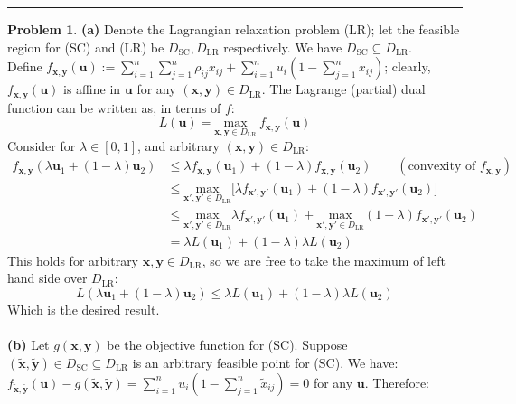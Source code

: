 \documentclass[a4paper, 8pt]{article}
\theoremstyle{definition}
\newtheorem{problem}{Problem}
\theoremstyle{hSol}
\begin{document}
\noindent\rule{16cm}{0.4pt}
\begin{problem} \textbf{(a)} Denote the Lagrangian relaxation problem (LR); let the feasible region for (SC) and (LR) be $D_{\text{SC}}, D_{\text{LR}}$ respectively. We have $D_{\text{SC}}\subseteq D_{\text{LR}}$. \\
Define $f_{\bm{x,y}}(\bm{u}):=\sum_{i=1}^n \sum_{j=1}^n \rho_{ij}x_{ij}+\sum_{i=1}^n u_i\left(1-\sum_{j=1}^n x_{ij}\right)$; clearly, $f_{\bm{x,y}}(\bm{u})$ is affine in $\bm{u}$ for any $(\bm{x}, \bm{y}) \in D_{\text{LR}}$. The Lagrange (partial) dual function can be written as, in terms of $f$:
\begin{equation}
	L(\bm{u}) = \underset{\bm{x,y} \in D_{\text{LR}}}{\text{max}} ~f_{\bm{x,y}}(\bm{u})
\end{equation}
Consider for $\lambda\in [0,1]$, and arbitrary $(\bm{x}, \bm{y}) \in D_{\text{LR}}$:
\begin{equation}
	\begin{split}
		f_{\bm{x}, \bm{y}}(\lambda\bm{u}_1 + (1- \lambda) \bm{u}_2) & \leq  \lambda f_{\bm{x}, \bm{y}}(\bm{u}_1) + (1- \lambda)f_{\bm{x}, \bm{y}}(\bm{u}_2)\qquad(\text{convexity of } f_{\bm{x,y}})\\
		&\leq \underset{\bm{x}', \bm{y}' \in D_{\text{LR}}}{\text{max}} \big[\lambda f_{\bm{x}', \bm{y}'}(\bm{u}_1) + (1- \lambda)f_{\bm{x}', \bm{y}'}(\bm{u}_2)\big] \\
		&\leq \underset{\bm{x}', \bm{y}' \in D_{\text{LR}}}{\text{max}} \lambda f_{\bm{x}', \bm{y}'}(\bm{u}_1) + \underset{\bm{x}', \bm{y}' \in D_{\text{LR}}}{\text{max}}(1- \lambda)f_{\bm{x}', \bm{y}'}(\bm{u}_2)\\
		&= \lambda L(\bm{u}_1) + (1- \lambda)\lambda L(\bm{u}_2)
	\end{split}
\end{equation}
This holds for arbitrary $\bm{x}, \bm{y} \in D_{\text{LR}}$, so we are free to take the maximum of left hand side over $D_{\text{LR}}$:
\begin{equation}
	L(\lambda\bm{u}_1 + (1- \lambda) \bm{u}_2)\leq \lambda L(\bm{u}_1) + (1- \lambda)\lambda L(\bm{u}_2)
\end{equation}
Which is the desired result. \\
~\\
\textbf{(b)} Let $g(\bm{x}, \bm{y})$ be the objective function for (SC). Suppose $(\widetilde{\bm{x}}, \widetilde{\bm{y}}) \in D_{\text{SC}} \subseteq D_{\text{LR}}$ is an arbitrary feasible point for (SC). We have: $f_{\widetilde{\bm{x}}, \widetilde{\bm{y}}}(\bm{u}) - g(\widetilde{\bm{x}}, \widetilde{\bm{y}}) = \sum_{i=1}^n u_i\left(1-\sum_{j=1}^n \widetilde{x}_{ij}\right) = 0$ for any $\bm{u}$. Therefore:

\end{problem}
\end{document}
